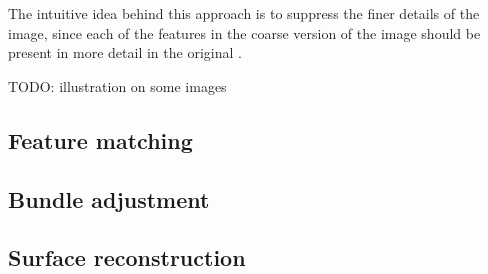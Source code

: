 The intuitive idea behind this approach is to suppress the finer details of the image, since each of the features in the coarse version of the image should be present in more detail in the original \cite{scalespace}.

TODO: illustration on some images


\subsection{Feature matching}


\subsection{Bundle adjustment}

\subsection{Surface reconstruction}

